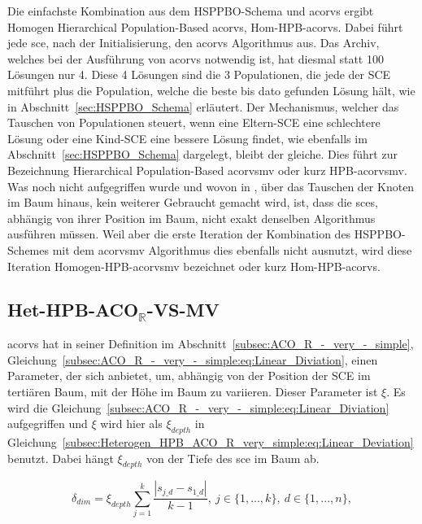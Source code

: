 \documentclass[fontsize=12, a4aper]{scrartcl}
\begin{document}
	\noindent Die einfachste Kombination aus dem HSPPBO-Schema und \ac{acorvs} ergibt Homogen Hierarchical Population-Based \ac{acorvs}, Hom-HPB-\ac{acorvs}. Dabei führt jede \ac{sce}, nach der Initialisierung, den \ac{acorvs} Algorithmus aus. Das Archiv, welches bei der Ausführung von \ac{acorvs} notwendig ist, hat diesmal statt 100 Lösungen nur 4. Diese 4 Lösungen sind die 3 Populationen, die jede der SCE mitführt plus die Population, welche die beste bis dato gefunden Lösung hält, wie in Abschnitt~\ref{sec:HSPPBO_Schema} erläutert. Der Mechanismus, welcher das Tauschen von Populationen steuert, wenn eine Eltern-SCE eine schlechtere Lösung oder eine Kind-SCE eine bessere Lösung findet, wie ebenfalls im Abschnitt~\ref{sec:HSPPBO_Schema} dargelegt, bleibt der gleiche. Dies führt zur Bezeichnung Hierarchical Population-Based \acl{acorvsmv} oder kurz HPB-\ac{acorvsmv}. Was noch nicht aufgegriffen wurde und wovon in \cite{kupfer2021hierarchical}, über das Tauschen der Knoten im Baum hinaus, kein weiterer Gebraucht gemacht wird, ist, dass die \acp{sce}, abhängig von ihrer Position im Baum, nicht exakt denselben Algorithmus ausführen müssen. Weil aber die erste Iteration der Kombination des HSPPBO-Schemes mit dem \ac{acorvsmv} Algorithmus dies ebenfalls nicht ausnutzt, wird diese Iteration Homogen-HPB-\ac{acorvsmv} bezeichnet oder kurz Hom-HPB-\ac{acorvs}.\hfill\newline
	
	\subsection{Het-HPB-ACO\(_\mathbb{R}\)-VS-MV} \label{subsec:Heterogen_HPB_ACO_R_very_simple}
	
	\ac{acorvs} hat in seiner Definition im Abschnitt~\ref{subsec:ACO_R_-_very_-_simple}, Gleichung~\ref{subsec:ACO_R_-_very_-_simple:eq:Linear_Diviation}, einen Parameter, der sich anbietet, um, abhängig von der Position der SCE im tertiären Baum, mit der Höhe im Baum zu variieren. Dieser Parameter ist \(\xi\). Es wird die Gleichung~\ref{subsec:ACO_R_-_very_-_simple:eq:Linear_Diviation} aufgegriffen und \(\xi\) wird hier als \(\xi_{depth}\) in Gleichung~\ref{subsec:Heterogen_HPB_ACO_R_very_simple:eq:Linear_Deviation} benutzt. Dabei hängt \(\xi_{depth}\) von der Tiefe des \ac{sce} im Baum ab.
	
	\begin{equation} \label{subsec:Heterogen_HPB_ACO_R_very_simple:eq:Linear_Deviation}
		\delta_{dim} = \xi_{depth}\sum_{j=1}^{k} \frac{|s_{j\_d}-s_{1\_d}|}{k-1}, ~ j \in \{1, ..., k\}, ~ d \in \{1, ..., n\},
	\end{equation}
	
\end{document}
